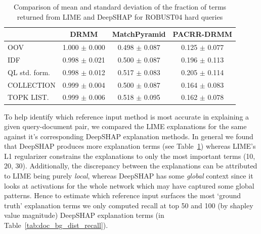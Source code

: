 \begin{table}
\footnotesize
\centering
\begin{tabular}{lccc} 
 \toprule
 & DRMM & MatchPyramid & PACRR-DRMM \\
 \midrule


OOV & 1.000 $\pm$ 0.000 & 0.498 $\pm$ 0.087 & 0.125 $\pm$ 0.077\\

IDF & 0.998 $\pm$ 0.021 & 0.500 $\pm$ 0.087 & 0.196 $\pm$ 0.113\\

QL std. form. & 0.998 $\pm$ 0.012 & 0.517 $\pm$ 0.083 & 0.205 $\pm$ 0.114\\

COLLECTION & 0.999 $\pm$ 0.004 & 0.500 $\pm$ 0.087 & 0.164 $\pm$ 0.083\\

TOPK LIST. & 0.999 $\pm$ 0.006 & 0.518 $\pm$ 0.095 & 0.162 $\pm$ 0.078\\
\bottomrule
 \end{tabular}
 \caption{Comparison of mean and standard deviation of the fraction of terms returned from LIME and DeepSHAP for ROBUST04 hard queries}
\label{tab:queries_diff_mean_std_terms_shap}
\end{table}

To help identify which reference input method is most accurate in explaining a given query-document pair, we compared the LIME explanations for the same against it's corresponding DeepSHAP explanation methods. In general we found that DeepSHAP produces more explanation terms (see Table~\ref{tab:queries_diff_mean_std_terms_shap}) whereas LIME's L1 regularizer constrains the explanations to only the most important terms (10, 20, 30). Additionally, the discrepancy between the explanations can be attributed to LIME being purely \textit{local}, whereas DeepSHAP has some \textit{global} context since it looks at activations for the whole network which may have captured some global patterns. Hence to estimate which reference input surfaces the most `ground truth' explanation terms we only computed recall at top 50 and 100 (by shapley value magnitude) DeepSHAP explanation terms (in Table~\ref{tab:doc_bg_dist_recall}).

